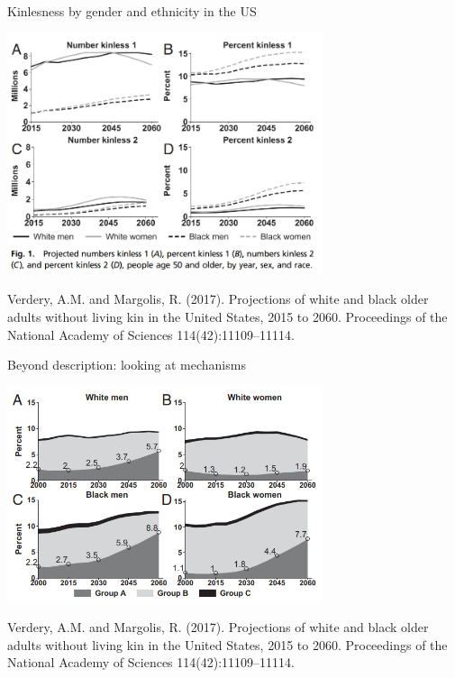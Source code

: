 \documentclass[
  ignorenonframetext,
]{beamer}
\begin{document}
\begin{frame}{Kinlesness by gender and ethnicity in the US}
\protect\hypertarget{kinlesness-by-gender-and-ethnicity-in-the-us}{}

\includegraphics[width=3.64583in,height=\textheight]{resources/verdery.PNG}

\tiny Verdery, A.M. and Margolis, R. (2017). Projections of white and
black older adults without living kin in the United States, 2015 to
2060. Proceedings of the National Academy of Sciences
114(42):11109--11114.

\end{frame}

\begin{frame}{Beyond description: looking at mechanisms}
\protect\hypertarget{beyond-description-looking-at-mechanisms}{}

\includegraphics[width=3.64583in,height=\textheight]{resources/verdery_mechanisms.PNG}

\tiny Verdery, A.M. and Margolis, R. (2017). Projections of white and
black older adults without living kin in the United States, 2015 to
2060. Proceedings of the National Academy of Sciences
114(42):11109--11114.

\end{frame}
\end{document}
